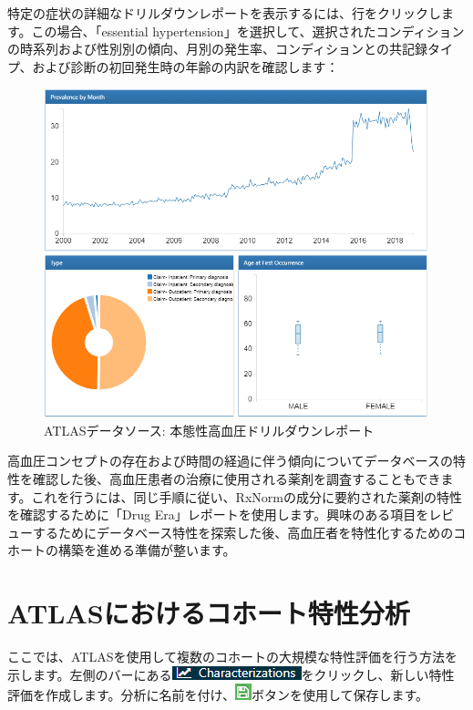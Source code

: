 \documentclass[
  11pt]{book}
\theoremstyle{definition}
\theoremstyle{definition}
\theoremstyle{definition}
\theoremstyle{definition}
\theoremstyle{remark}
\begin{document}
特定の症状の詳細なドリルダウンレポートを表示するには、行をクリックします。この場合、「essential hypertension」を選択して、選択されたコンディションの時系列および性別別の傾向、月別の発生率、コンディションとの共記録タイプ、および診断の初回発生時の年齢の内訳を確認します：

\begin{figure}

{\centering \includegraphics[width=1\linewidth]{images/Characterization/atlasDataSourcesDrillDownReport} 

}

\caption{ATLASデータソース: 本態性高血圧ドリルダウンレポート}\label{fig:atlasDataSourcesDrillDownReport}
\end{figure}

高血圧コンセプトの存在および時間の経過に伴う傾向についてデータベースの特性を確認した後、高血圧患者の治療に使用される薬剤を調査することもできます。これを行うには、同じ手順に従い、RxNormの成分に要約された薬剤の特性を確認するために「Drug Era」レポートを使用します。興味のある項目をレビューするためにデータベース特性を探索した後、高血圧者を特性化するためのコホートの構築を進める準備が整います。

\section{ATLASにおけるコホート特性分析}\label{atlasux306bux304aux3051ux308bux30b3ux30dbux30fcux30c8ux7279ux6027ux5206ux6790}

ここでは、ATLASを使用して複数のコホートの大規模な特性評価を行う方法を示します。左側のバーにある\includegraphics{images/Characterization/atlasCharacterizationMenuItem.png}をクリックし、新しい特性評価を作成します。分析に名前を付け、\includegraphics{images/PopulationLevelEstimation/save.png}ボタンを使用して保存します。
\end{document}
